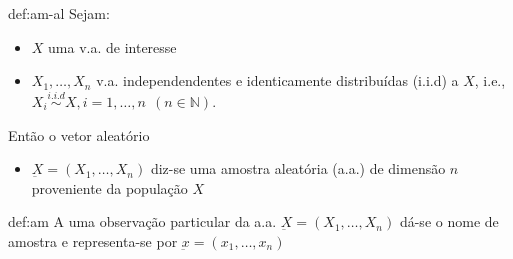 \begin{theo}{def:am-al}\label{def:am-al}
    \noindent Sejam:
    \begin{itemize}
        \item $X$ uma v.a. de interesse
        \item $X_1, \dots, X_n$ v.a. independendentes e identicamente distribuídas (i.i.d) a $X$, i.e., $X_i \overset{i.i.d}{\sim} X, i = 1,\dots, n\;\, (n \in \mathbb{N})$.
    \end{itemize}

    \noindent Então o vetor aleatório
    \begin{itemize}
        \item $\underbar{X} = (X_1, \dots, X_n)$ diz-se uma amostra aleatória (a.a.) de dimensão $n$ proveniente da população $X$
    \end{itemize}
\end{theo}

\begin{theo}{def:am}\label{def:am}
    \noindent A uma observação particular da a.a. $\underbar X = (X_1, \dots, X_n)$ dá-se o nome de amostra e representa-se por $\underbar x = (x_1, \dots, x_n)$
\end{theo}

